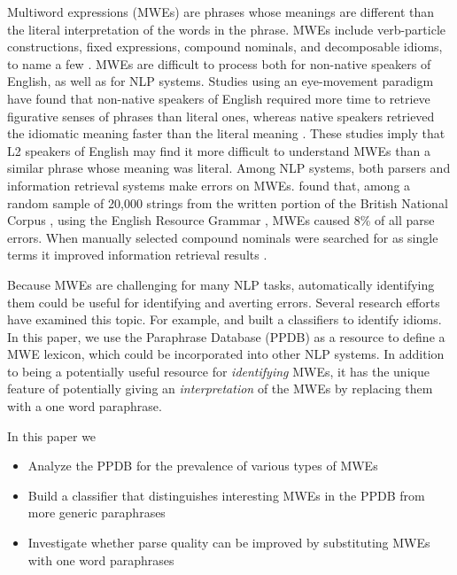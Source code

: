 \documentclass[11pt]{article}
\begin{document}
Multiword expressions (MWEs) are phrases whose meanings are different than the literal interpretation of the words in the phrase. MWEs include verb-particle constructions, fixed expressions, compound nominals, and decomposable idioms, to name a few \cite{Sag2002}.  MWEs are difficult to process both for non-native speakers of English, as well as for NLP systems. Studies using an eye-movement paradigm have found that non-native speakers of English required more time to retrieve figurative senses of phrases than literal ones, whereas native speakers retrieved the idiomatic meaning faster than the literal meaning \cite{siyanova-chanturia-martinez:2014}. These studies imply that L2 speakers of English may find it more difficult to understand MWEs than a similar phrase whose meaning was literal.  Among NLP systems, both parsers and information retrieval systems make errors on MWEs.  found that, among a random sample of 20,000 strings from the written portion of the British National Corpus \cite{Burnard2000}, using the English Resource Grammar \cite{Copestake+Flickinger2000}, MWEs caused 8\% of all parse errors. When manually selected compound nominals were searched for as single terms it improved information retrieval results \cite{Acosta2011}.

Because MWEs are challenging for many NLP tasks, automatically identifying them could be useful for identifying and averting errors.  Several research efforts have examined this topic.  For example,   and  built a classifiers to identify idioms.  In this paper, we use the Paraphrase Database (PPDB) as a resource to define a MWE lexicon, which could be incorporated into other NLP systems.  In addition to being a potentially useful resource for {\it identifying} MWEs, it has the unique feature of potentially giving an {\it interpretation} of the MWEs by replacing them with a one word paraphrase.  

In this paper we
\begin{itemize}
\item Analyze the PPDB for the prevalence of various types of MWEs
\item Build a classifier that distinguishes interesting MWEs in the PPDB from more generic paraphrases
\item Investigate whether parse quality can be improved by substituting MWEs with one word paraphrases
\end{itemize}
\end{document}
